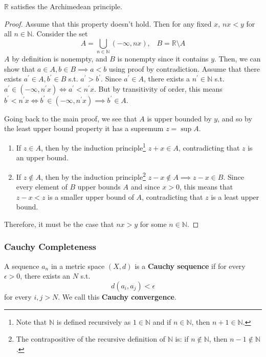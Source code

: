 \documentclass{article}
\begin{document}
      \begin{theorem}
        $\mathbb{R}$ satisfies the Archimedean principle. 
      \end{theorem}
      \begin{proof}
        Assume that this property doesn't hold. Then for any fixed $x$, $nx < y$ for all $n \in \mathbb{N}$. Consider the set 
        \begin{equation}
          A = \bigcup_{n \in \mathbb{N}} (-\infty, nx), \;\;\; B = \mathbb{R} \setminus A
        \end{equation}
        $A$ by definition is nonempty, and $B$ is nonempty since it contains $y$. Then, we can show that $a \in A, b \in B \implies a < b$ using proof by contradiction. Assume that there exists $a^\prime \in A, b^\prime \in B$ s.t. $a^\prime > b^\prime$. Since $a^\prime \in A$, there exists a $n^\prime \in \mathbb{N}$ s.t. $a^\prime \in (-\infty, n^\prime x) \iff a^\prime < n^\prime x$. But by transitivity of order, this means $b^\prime < n^\prime x \iff b^\prime \in (-\infty, n^\prime x) \implies b^\prime \in A$. 

        Going back to the main proof, we see that $A$ is upper bounded by $y$, and so by the least upper bound property it has a supremum $z = \sup{A}$. 
        \begin{enumerate}
          \item If $z \in A$, then by the induction principle\footnote{Note that $\mathbb{N}$ is defined recursively as $1 \in \mathbb{N}$ and if $n \in \mathbb{N}$, then $n+1 \in \mathbb{N}$. } $z + x \in A$, contradicting that $z$ is an upper bound. 
          \item If $z \not\in A$, then by the induction principle\footnote{The contrapositive of the recursive definition of $\mathbb{N}$ is: if $n \not\in \mathbb{N}$, then $n-1 \not\in \mathbb{N}$.} $z-x \not\in A \implies z-x \in B$. Since every element of $B$ upper bounds $A$ and since $x > 0$, this means that $z-x < z$ is a smaller upper bound of $A$, contradicting that $z$ is a least upper bound. 
        \end{enumerate}
        Therefore, it must be the case that $nx > y$ for some $n \in \mathbb{N}$. 
      \end{proof}

    \subsubsection{Cauchy Completeness} 

      \begin{definition}
        A sequence $a_n$ in a metric space $(X, d)$ is a \textbf{Cauchy sequence} if for every $\epsilon > 0$, there exists an $N$ s.t. 
        \begin{equation}
          d(a_i, a_j) < \epsilon
        \end{equation}
        for every $i, j > N$. We call this \textbf{Cauchy convergence}. 
      \end{definition}
\end{document}
